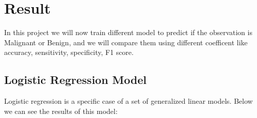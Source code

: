 \documentclass[]{article}
\newenvironment{Shaded}{\begin{snugshade}}{\end{snugshade}}
\newcommand{\DataTypeTok}[1]{\textcolor[rgb]{0.13,0.29,0.53}{#1}}
\newcommand{\KeywordTok}[1]{\textcolor[rgb]{0.13,0.29,0.53}{\textbf{#1}}}
\newcommand{\NormalTok}[1]{#1}
\newcommand{\OperatorTok}[1]{\textcolor[rgb]{0.81,0.36,0.00}{\textbf{#1}}}
\newcommand{\StringTok}[1]{\textcolor[rgb]{0.31,0.60,0.02}{#1}}
\begin{document}
\hypertarget{result}{%
\section{Result}\label{result}}

In this project we will now train different model to predict if the
observation is Malignant or Benign, and we will compare them using
different coefficent like accuracy, sensitivity, specificity, F1 score.

\hypertarget{logistic-regression-model}{%
\subsection{Logistic Regression Model}\label{logistic-regression-model}}

Logistic regression is a specific case of a set of generalized linear
models. Below we can see the results of this model:

\begin{Shaded}
\end{Shaded}
\end{document}
